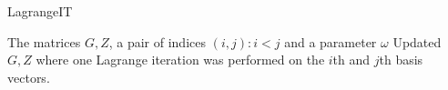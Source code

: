 \begin{algorithm}[H]
\caption{LagrangeIT}
\label{customLagrangeIT}
\begin{algorithmic}
\REQUIRE The matrices $G, Z$, a pair of indices $(i,j):i<j$ and a parameter $\omega$
\ENSURE  Updated $G, Z$ where one Lagrange iteration was performed on the $i$th and $j$th basis vectors. 


\ENDIF




\ENDFOR

\ENDIF

\end{algorithmic}
\end{algorithm}
